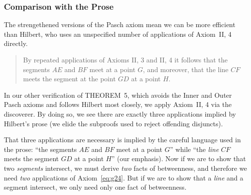 \subsubsection{Comparison with the Prose}
The strengethened versions of the Pasch axiom mean we can be more efficient than Hilbert, who uses an unspecified number of applications of Axiom~II, 4 directly.

\begin{quote}
By repeated applications of Axioms II, 3 and II, 4 it follows that the segments $AE$ and $BF$ meet at a point $G$, and moreover, that the line $CF$ meets the segment at the point $GD$ at a point $H$.
\end{quote}

In our other verification of THEOREM~5, which avoids the Inner and Outer Pasch axioms and follows Hilbert most closely, we apply Axiom~II, 4 via the  discoverer. By doing so, we see there are exactly three applications implied by Hilbert's prose (we elide the subproofs used to reject offending disjuncts).

\linebreak

That three applications are necessary is implied by the careful language used in the prose: ``the segments $AE$ and $BF$ meet at a point $G$'' while ``the \emph{line} $CF$ meets the segment $GD$ at a point $H$'' (our emphasis). Now if we are to show that two \emph{segments} intersect, we must derive \emph{two} facts of betweenness, and therefore we need \emph{two} applications of Axiom~\ref{eq:g24}. But if we are to show that a \emph{line} and a segment intersect, we only need only one fact of betweenness. 

